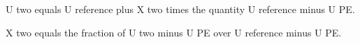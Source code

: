 U two equals U reference plus X two times the quantity U reference minus U PE.

X two equals the fraction of U two minus U PE over U reference minus U PE.